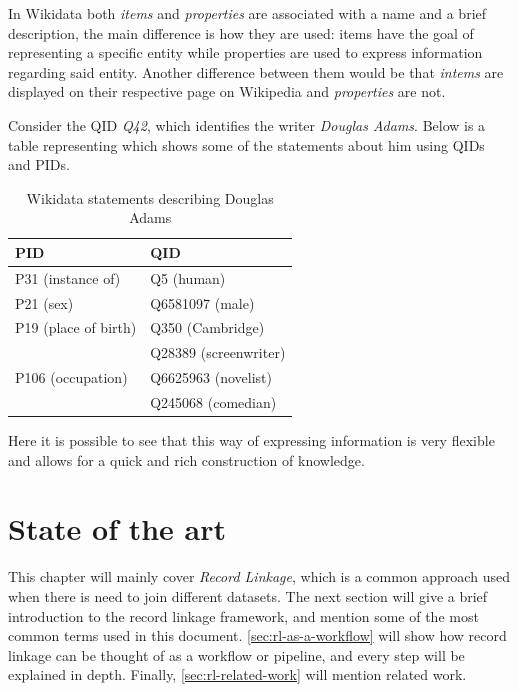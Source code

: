 \documentclass[epsfig,a4paper,11pt,titlepage,twoside,openany]{book}
\begin{document}
In Wikidata both \textit{items} and \textit{properties} are associated with a name and a
brief description, the main difference is how they are used: items have the
goal of representing a specific entity while properties are used to express 
information regarding said entity. Another difference between them would be that \textit{intems} are displayed on their respective page on Wikipedia and \textit{properties} are not.

Consider the QID \textit{Q42}, which identifies the writer
\textit{Douglas Adams}. Below is a table representing which shows some of the statements about him
using QIDs and PIDs.

\begin{table}[H]
  \centering
  \begin{tabular}{l|l}
    PID                                & QID                   \\ \hline
    P31 (instance of)                  & Q5 (human)            \\ \hline
    P21 (sex)                          & Q6581097 (male)       \\ \hline
    P19 (place of birth)               & Q350 (Cambridge)      \\ \hline
    \multirow{3}{*}{P106 (occupation)} & Q28389 (screenwriter) \\ \cline{2-2} 
                                       & Q6625963 (novelist)   \\ \cline{2-2} 
                                       & Q245068 (comedian)   
  \end{tabular}
  \caption{Wikidata statements describing Douglas Adams}
  \label{tab:intro-wikidata-douglas42}
\end{table}

Here it is possible to see that this way of expressing information is very
flexible and allows for a quick and rich construction of knowledge. 






\chapter{State of the art}
\label{chap:state-of-the-art}

This chapter will mainly cover \textit{Record Linkage}, which is a common approach used when there is need to join different datasets. The next section will give a brief introduction to the record linkage framework, and mention some of the most common terms used in this document. \autoref{sec:rl-as-a-workflow} will show how record linkage can be thought of as a workflow or pipeline, and every step will be explained in depth. Finally, \autoref{sec:rl-related-work} will mention related work.
\end{document}
